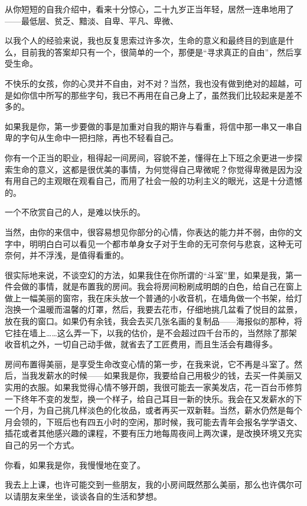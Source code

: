 \par {}
\par 从你短短的自我介绍中，看来十分惊心，二十九岁正当年轻，居然一连串地用了——最低层、贫乏、黯淡、自卑、平凡、卑微、
\par 以我个人的经验来说，我也反复思索过许多次，生命的意义和最终目的到底是什么，目前我的答案却只有一个，很简单的一个，那便是“寻求真正的自由”，然后享受生命。
\par 不快乐的女孩，你的心灵并不自由，对不对？当然，我也没有做到绝对的超越，可是如你信中所写的那些字句，我已不再用在自己身上了，虽然我们比较起来是差不多的。
\par 如果我是你，第一步要做的事是加重对自我的期许与看重，将信中那一串又一串自卑的字句从生命中一把扫除，再也不轻看自己。
\par 你有一个正当的职业，租得起一间房间，容貌不差，懂得在上下班之余更进一步探索生命的意义，这都是很优美的事情，为何觉得自己卑微呢？你觉得卑微是因为没有用自己的主观眼在观看自己，而用了社会一般的功利主义的眼光，这是十分遗憾的。
\par 一个不欣赏自己的人，是难以快乐的。
\par 当然，由你的来信中，很容易想见你部分的心情，你表达的能力并不弱，由你的文字中，明明白白可以看见一个都市单身女子对于生命的无可奈何与悲哀，这种无可奈何，并不浮浅，是值得看重的。
\par 很实际地来说，不谈空幻的方法，如果我住在你所谓的“斗室”里，如果是我，第一件会做的事情，就是布置我的房间。我会将房间粉刷成明朗的白色，给自己在窗上做上一幅美丽的窗帘，我在床头放一个普通的小收音机，在墙角做一个书架，给灯泡换一个温暖而温馨的灯罩，然后，我要去花市，仔细地挑几盆看了悦目的盆景，放在我的窗口。如果仍有余钱，我会去买几张名画的复制品——海报似的那种，将它挂在墙上……这么弄一下，以我的估价，是不会超过四千台币的，当然除了那架收音机之外，一切自己动手做，就省去了工匠费用，而且生活会有趣得多。
\par 房间布置得美丽，是享受生命改变心情的第一步，在我来说，它不再是斗室了。然后，当我发薪水的时候——如果我是你，我要给自己用极少的钱，去买一件美丽又实用的衣服。如果我觉得心情不够开朗，我很可能去一家美发店，花一百台币修剪一下终年不变的发型，换一个样子，给自己耳目一新的快乐。我会在又发薪水的下一个月，为自己挑几样淡色的化妆品，或者再买一双新鞋。当然，薪水仍然是每个月会领的，下班后也有四五小时的空闲，那时候，我可能去青年会报名学学语文、插花或者其他感兴趣的课程，不要有压力地每周夜间上两次课，是改换环境又充实自己的另一个方式。
\par 你看，如果我是你，我慢慢地在变了。
\par 我去上上课，也许可能交到一些朋友，我的小房间既然那么美丽，那么也许偶尔可以请朋友来坐坐，谈谈各自的生活和梦想。
